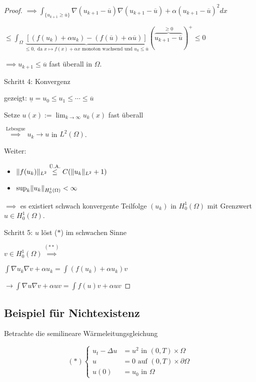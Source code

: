 \begin{proof}
  $\implies \int_{\{u_{k + 1} \geq \overline u\}} \nabla (u_{k + 1} - \overline u) \nabla (u_{ k + 1} - \overline u) + \alpha (u_{k + 1} - \overline u)^2 dx$

  $\leq \int_\Omega \underbrace{[(f(u_k) + \alpha u_k) - (f(\overline u) + \alpha \overline u)]}_{\leq 0, \text{ da } x \mapsto f(x) + \alpha x \text{ monoton wachsend und } u_k \leq \overline u} (\overbrace{u_{k + 1} - \overline u}^{\geq 0})^+ \leq 0$

  $\implies u_{k + 1} \leq \overline u$ fast überall in $\Omega$.

  Schritt 4: Konvergenz

  gezeigt: $\underline u = u_0 \leq u_1 \leq \cdots \leq \overline u$

  Setze $u(x) := \lim_{ k \to \infty } u_k (x)$ fast überall

  $\overset{\text{Lebesgue}}{\implies} u_k \to u $ in $L^2(\Omega)$.

  Weiter: 
  \begin{itemize}
    \item $\lVert f(u_k) \rVert_{L^2} \overset{\text{Ü.A.}}{\leq} C(\lVert u_k \rVert_{L^2} + 1)$
    \item $\sup_k \lVert u_k \rVert_{H_0^1(\Omega)} < \infty$
  \end{itemize}

  $\implies$ es existiert schwach konvergente Teilfolge $(u_k)$ in $H_0^1(\Omega)$ mit Grenzwert $u \in H_0^1(\Omega)$.

  Schritt 5: $u$ löst ($\ast$) im schwachen Sinne

  $v \in H_0^1(\Omega) \overset{(\ast\ast)}{\implies}$

  $\int \nabla u_k \nabla v + \alpha u_k = \int (f(u_k) + \alpha u_k) v$

  $\to \int \nabla u \nabla v + \alpha u v = \int f(u) v +  \alpha u v$
\end{proof}


\subsection{Beispiel für Nichtexistenz}

Betrachte die semilineare Wärmeleitungsgleichung

$$
(\ast)
\begin{cases}
  u_t - \Delta u &= u^2 \text{ in } (0, T) \times \Omega \\
  u &= 0 \text{ auf } (0,T) \times \partial \Omega \\
  u(0) &= u_0 \text{ in } \Omega  
\end{cases}
$$

